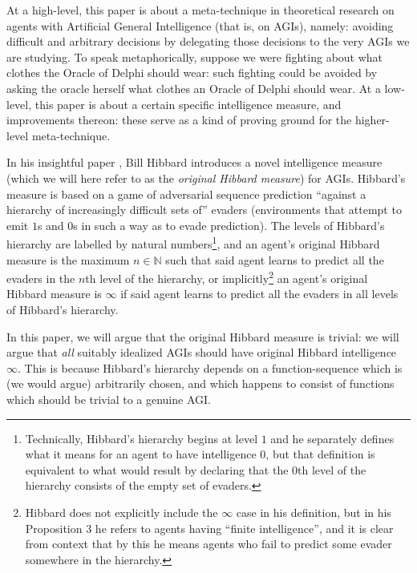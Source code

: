 \documentclass{article}
\begin{document}
At a high-level, this paper is about a meta-technique in theoretical research
on agents with Artificial General Intelligence (that is, on AGIs), namely:
avoiding difficult and arbitrary decisions by delegating those decisions to the
very AGIs we are studying. To speak metaphorically, suppose we were fighting about
what clothes the Oracle of Delphi should wear: such fighting could be avoided
by asking the oracle herself what clothes an Oracle of Delphi should wear. At
a low-level, this paper is about a certain specific intelligence measure, and
improvements thereon: these serve as a kind of proving ground for the
higher-level meta-technique.

In his insightful paper \cite{hibbard}, Bill Hibbard introduces a novel
intelligence measure (which we will here refer to as the \emph{original Hibbard measure})
for AGIs.
Hibbard's measure is based on a game of adversarial sequence
prediction \cite{hibbard2008adversarial}
``against a hierarchy of increasingly difficult sets of'' evaders (environments that attempt
to emit $1$s and $0$s in such a way as to evade prediction).
The levels of Hibbard's hierarchy are labelled by natural numbers\footnote{Technically,
Hibbard's hierarchy begins at level $1$ and he separately defines what it means for
an agent to have intelligence $0$, but that definition is equivalent to what would result
by declaring that the $0$th level of the hierarchy consists of the empty set of evaders.}, and
an agent's original Hibbard measure is the maximum $n\in\mathbb N$ such that
said agent learns to predict all the evaders in the $n$th level of the hierarchy,
or implicitly\footnote{Hibbard does not explicitly include the $\infty$ case in his
definition, but in his Proposition 3 he refers to agents having ``finite intelligence'', and
it is clear from context that by this he means agents who fail to predict some evader
somewhere in the hierarchy.} an agent's original Hibbard measure is $\infty$
if said agent learns to predict all the evaders in all levels of Hibbard's hierarchy.

In this paper, we will argue that the original Hibbard measure is
trivial: we will argue that \emph{all} suitably idealized AGIs should have
original Hibbard intelligence $\infty$. This is because Hibbard's hierarchy
depends on a function-sequence which is (we would argue) arbitrarily chosen,
and which happens to consist of functions which should be trivial to a genuine AGI.
\end{document}
